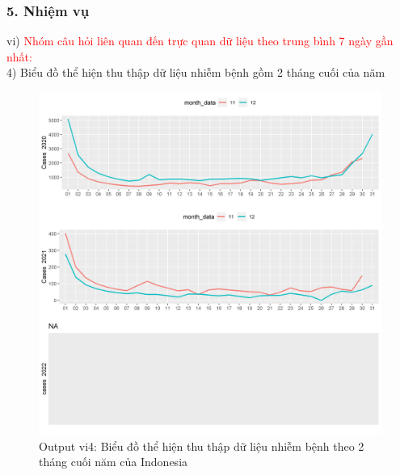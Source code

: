 \documentclass[english,10pt,table]{beamer}
\begin{document}
\begin{frame}[fragile]
\frametitle{5.  Nhiệm vụ}
vi) \textcolor{red}{Nhóm câu hỏi liên quan đến trực quan dữ liệu theo trung bình 7 ngày gần nhất:}\\
    4) Biểu đồ thể hiện thu thập dữ liệu nhiễm bệnh gồm 2 tháng cuối của năm
	\begin{figure}[h!]
	\begin{center}
		    \includegraphics[scale = 0.26]{Images/VI/vi4 Indonesia .jpeg}
		     \caption{Output vi4: Biểu đồ thể hiện thu thập dữ liệu nhiễm bệnh theo 2 tháng cuối năm của Indonesia}
		\end{center}
		\end{figure}
\end{frame}
\end{document}
